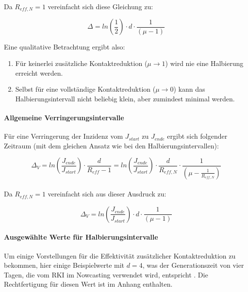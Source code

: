 \documentclass[a4paper]{article}
\begin{document}
    Da $R_{eff,N}=1$ vereinfacht sich diese Gleichung zu: 

    \begin{equation}
        \Delta = ln(\frac{1}{2}) \cdot d \cdot \frac{1}{ ( \mu - 1 ) }
    \end{equation}

    Eine qualitative Betrachtung ergibt also: 

    \begin{enumerate}
        \item Für keinerlei zusätzliche Kontaktreduktion ($\mu \to 1 $) wird nie eine Halbierung erreicht werden.
        \item Selbst für eine vollständige Kontaktreduktion ($\mu \to 0 $) kann das Halbierungsintervall nicht beliebig klein, aber zumindest minimal werden. 
    \end{enumerate}

    \paragraph{Allgemeine Verringerungsintervalle}Für eine Verringerung der Inzidenz vom $J_{start}$ zu $J_{ende}$ ergibt sich folgender Zeitraum (mit dem gleichen Ansatz wie bei den Halbierungsintervallen): 

    \begin{equation}
        \Delta_V = ln(\frac{J_{ende}}{J_{start}}) \cdot \frac{d}{R_{eff} - 1} = ln(\frac{J_{ende}}{J_{start}}) \cdot \frac{d}{R_{eff,N}} \cdot \frac{1}{ ( \mu - \frac{1}{R_{eff,N}} )}
    \end{equation}

    \paragraph{}Da $R_{eff,N}=1$ vereinfacht sich aus dieser Ausdruck zu: 

    $$ \Delta_V = ln(\frac{J_{ende}}{J_{start}}) \cdot d \cdot \frac{1}{ ( \mu - 1 ) } $$

    \paragraph{Ausgewählte Werte für Halbierungsintervalle} Um einige Vorstellungen für die Effektivität zusätzlicher Kontaktreduktion zu bekommen, hier einige Beispielwerte mit $d=4$, was der Generationszeit von vier Tagen, die vom RKI im Nowcasting verwendet wird, entspricht \cite{heidenNowcasting}. Die Rechtfertigung für diesen Wert ist im Anhang enthalten.
\end{document}

